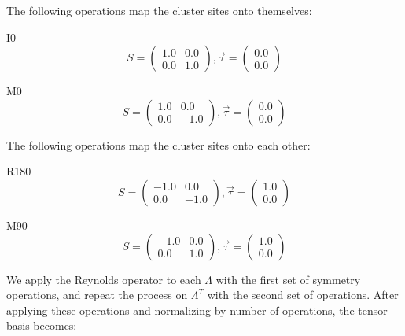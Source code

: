 \documentclass[12pt, fleqn]{article}
\begin{document}
\noindent
The following operations map the cluster sites onto themselves:

I0
\begin{equation}
    S=
    \begin{pmatrix}
        1.0&0.0\\
        0.0&1.0
    \end{pmatrix}
    ,\vec{\tau}=
    \begin{pmatrix}
        0.0\\
        0.0
    \end{pmatrix}
    \label{I0}
\end{equation}

M0
\begin{equation}
    S=
    \begin{pmatrix}
        1.0&0.0\\
        0.0&-1.0
    \end{pmatrix}
    ,\vec{\tau}=
    \begin{pmatrix}
        0.0\\
        0.0
    \end{pmatrix}
    \label{M0}
\end{equation}

\noindent
The following operations map the cluster sites onto each other:

R180
\begin{equation}
    S=
    \begin{pmatrix}
        -1.0&0.0\\
        0.0&-1.0
    \end{pmatrix}
    ,\vec{\tau}=
    \begin{pmatrix}
        1.0\\
        0.0
    \end{pmatrix}
    \label{R180}
\end{equation}

M90
\begin{equation}
    S=
    \begin{pmatrix}
        -1.0&0.0\\
        0.0&1.0
    \end{pmatrix}
    ,\vec{\tau}=
    \begin{pmatrix}
        1.0\\
        0.0
    \end{pmatrix}
    \label{M90}
\end{equation}

We apply the Reynolds operator to each $\Lambda$ with the first set of symmetry operations,
and repeat the process on $\Lambda^{T}$ with the second set of operations. After applying
these operations and normalizing by number of operations, the tensor basis becomes:
\end{document}
